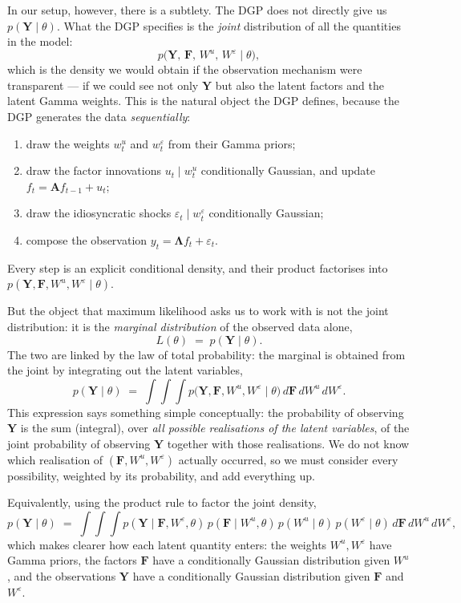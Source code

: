 \documentclass[11pt, a4paper, oneside]{article}
\newcommand{\mY}{\mathbf{Y}}
\newcommand{\mF}{\mathbf{F}}
\newcommand{\mL}{\boldsymbol{\Lambda}}
\newcommand{\mA}{\mathbf{A}}
\begin{document}
In our setup, however, there is a subtlety. The DGP does not directly
give us $p(\mY \mid \theta)$. What the DGP specifies is the \emph{joint}
distribution of all the quantities in the model:
\[
p\big(\mY,\, \mF,\, W^u,\, W^\varepsilon \mid \theta\big),
\]
which is the density we would obtain if the observation mechanism were
transparent — if we could see not only $\mY$ but also the latent factors
and the latent Gamma weights. This is the natural object the DGP
defines, because the DGP generates the data \emph{sequentially}:
\begin{enumerate}[leftmargin=1.5em, itemsep=2pt]
    \item draw the weights $w^u_t$ and $w^\varepsilon_t$ from their Gamma priors;
    \item draw the factor innovations $u_t \mid w^u_t$ conditionally Gaussian,
          and update $f_t = \mA f_{t-1} + u_t$;
    \item draw the idiosyncratic shocks $\varepsilon_t \mid w^\varepsilon_t$
          conditionally Gaussian;
    \item compose the observation $y_t = \mL f_t + \varepsilon_t$.
\end{enumerate}
Every step is an explicit conditional density, and their product
factorises into $p(\mY, \mF, W^u, W^\varepsilon \mid \theta)$.

But the object that maximum likelihood asks us to work with is not the
joint distribution: it is the \emph{marginal distribution} of the observed
data alone,
\[
L(\theta) \;=\; p(\mY \mid \theta).
\]
The two are linked by the law of total probability: the marginal is
obtained from the joint by integrating out the latent variables,
\begin{equation}
\boxed{\;\;
p(\mY \mid \theta) \;=\; \int\!\int\!\int
p\big(\mY, \mF, W^u, W^\varepsilon \mid \theta\big)\,
d\mF\, dW^u\, dW^\varepsilon.
\;\;}
\label{eq:marginal-likelihood}
\end{equation}
This expression says something simple conceptually: the probability of
observing $\mY$ is the sum (integral), over \emph{all possible
realisations of the latent variables}, of the joint probability of
observing $\mY$ together with those realisations. We do not know which
realisation of $(\mF, W^u, W^\varepsilon)$ actually occurred, so we must
consider every possibility, weighted by its probability, and add
everything up.

Equivalently, using the product rule to factor the joint density,
\[
p(\mY \mid \theta) \;=\; \int\!\int\!\int
p(\mY \mid \mF, W^\varepsilon, \theta)\, p(\mF \mid W^u, \theta)\,
p(W^u \mid \theta)\, p(W^\varepsilon \mid \theta)\,
d\mF\, dW^u\, dW^\varepsilon,
\]
which makes clearer how each latent quantity enters: the weights
$W^u, W^\varepsilon$ have Gamma priors, the factors $\mF$ have a
conditionally Gaussian distribution given $W^u$, and the observations
$\mY$ have a conditionally Gaussian distribution given $\mF$ and
$W^\varepsilon$.
\end{document}
